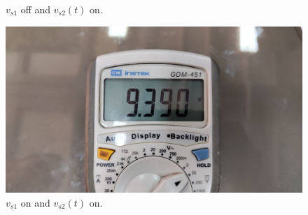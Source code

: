 \documentclass[11pt]{article}
\begin{document}
\begin{question}
\begin{subquestion}
{\begin{figure}[H]
                \caption{$v_{s1}$ off and $v_{s2}(t)$ on.}
            \end{figure}
            \begin{figure}[H]
                \centering
                \includegraphics[scale=\PicScale,angle=0]{Fig/15.jpeg}
                \caption{$v_{s1}$ on and $v_{s2}(t)$ on.}
            \end{figure}
        }
    \end{subquestion}

\end{question}

\end{document}
